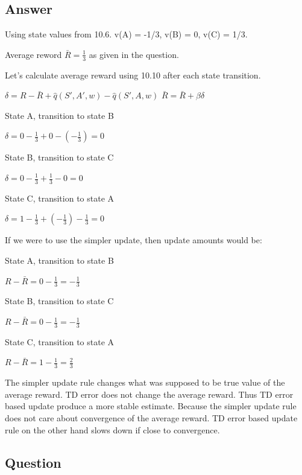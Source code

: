 \documentclass[11pt]{article}
\begin{document}
    \subsection*{Answer}

    Using state values from 10.6.
    v(A) = -1/3,
    v(B) = 0,
    v(C) = 1/3.

    \noindent Average reword $ \bar{R}=\frac{1}{3} $ as given in the question.

    \hfill \break
    \noindent Let's calculate average reward using 10.10 after each state transition.

    \noindent $ \delta = R - \bar{R} + \hat{q}(S',A',w) - \hat{q}(S',A,w) $
    \noindent $  \bar{R} = \bar{R} + \beta \delta $

    \noindent State A, transition to state B

    \noindent $ \delta = 0 - \frac{1}{3} + 0 - (-\frac{1}{3}) = 0 $

    \noindent State B, transition to state C

    \noindent $ \delta = 0 - \frac{1}{3} + \frac{1}{3} - 0 = 0 $

    \noindent State C, transition to state A

    \noindent $ \delta = 1 - \frac{1}{3} + (-\frac{1}{3}) - \frac{1}{3} = 0 $

    \hfill \break
    \noindent If we were to use the simpler update, then update amounts would be:

    \noindent State A, transition to state B

    \noindent $ R - \bar{R} = 0 - \frac{1}{3} = -\frac{1}{3} $

    \noindent State B, transition to state C

    \noindent $ R - \bar{R} = 0 - \frac{1}{3} = -\frac{1}{3} $

    \noindent State C, transition to state A

    \noindent $ R - \bar{R} = 1 - \frac{1}{3} = \frac{2}{3}$

    \hfill \break
    The simpler update rule changes what was supposed to be true value of the average reward.
    TD error does not change the average reward.
    Thus TD error based update produce a more stable estimate.
    Because the simpler update rule does not care about convergence of the average reward.
    TD error based update rule on the other hand slows down if close to convergence.

    \subsection{Question}
\end{document}
